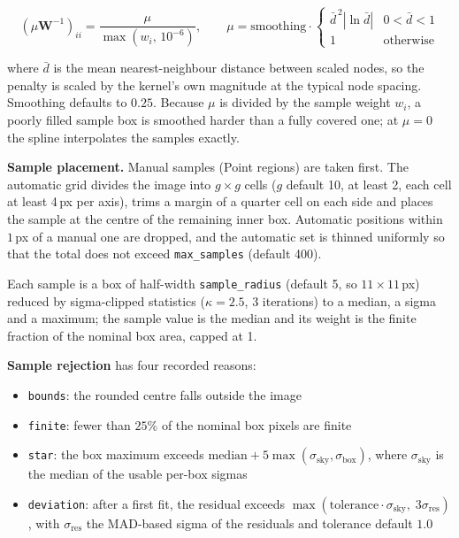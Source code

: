 \documentclass[11pt,a4paper]{article}
\newcommand{\code}[1]{\texttt{\small #1}}
\newcommand{\mat}[1]{\mathbf{#1}}
\begin{document}
    \begin{equation}
        \left(\mu \mat{W}^{-1}\right)_{ii} = \frac{\mu}{\max(w_i,\, 10^{-6})},
        \qquad
        \mu = \text{smoothing} \cdot \begin{cases}
            \bar{d}^{\,2} \left| \ln \bar{d} \right| & 0 < \bar{d} < 1 \\
            1 & \text{otherwise}
        \end{cases}
    \end{equation}

    where $\bar{d}$ is the mean nearest-neighbour distance between scaled nodes, so the penalty is scaled by the kernel's own magnitude at the typical node spacing. Smoothing defaults to $0.25$. Because $\mu$ is divided by the sample weight $w_i$, a poorly filled sample box is smoothed harder than a fully covered one; at $\mu = 0$ the spline interpolates the samples exactly.

    \textbf{Sample placement.} Manual samples (Point regions) are taken first. The automatic grid divides the image into $g \times g$ cells ($g$ default 10, at least 2, each cell at least 4\,px per axis), trims a margin of a quarter cell on each side and places the sample at the centre of the remaining inner box. Automatic positions within $1$\,px of a manual one are dropped, and the automatic set is thinned uniformly so that the total does not exceed \code{max\_samples} (default 400).

    Each sample is a box of half-width \code{sample\_radius} (default 5, so $11 \times 11$\,px) reduced by sigma-clipped statistics ($\kappa = 2.5$, 3 iterations) to a median, a sigma and a maximum; the sample value is the median and its weight is the finite fraction of the nominal box area, capped at 1.

    \textbf{Sample rejection} has four recorded reasons:

    \begin{itemize}[nosep]
    \item \code{bounds}: the rounded centre falls outside the image
    \item \code{finite}: fewer than $25\%$ of the nominal box pixels are finite
    \item \code{star}: the box maximum exceeds $\text{median} + 5 \max(\sigma_{\text{sky}}, \sigma_{\text{box}})$, where $\sigma_{\text{sky}}$ is the median of the usable per-box sigmas
    \item \code{deviation}: after a first fit, the residual exceeds $\max\!\left(\text{tolerance} \cdot \sigma_{\text{sky}},\; 3 \sigma_{\text{res}}\right)$, with $\sigma_{\text{res}}$ the MAD-based sigma of the residuals and tolerance default $1.0$
    \end{itemize}
\end{document}
